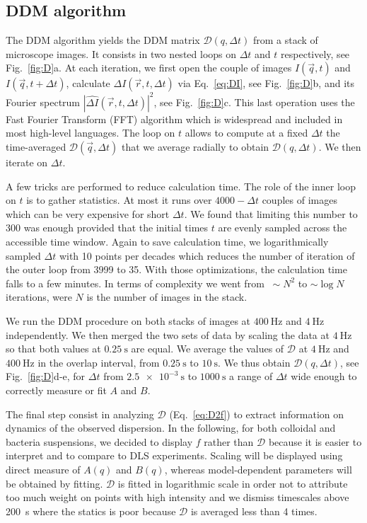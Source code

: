 \documentclass[prb,reprint,amsmath,amssymb]{revtex4-1}
\newcommand{\tg}[1]{{\color{magenta}#1}} %
\begin{document}
\subsection{DDM algorithm}

\tg{The DDM algorithm yields the DDM matrix $\mathcal{D}(q,\Delta t)$ from a stack of microscope images. It consists in two nested loops on $\Delta t$ and $t$ respectively, see Fig.~\ref{fig:D}a. At each iteration, we first open the couple of images $I(\vec{q},t)$ and $I(\vec{q},t+\Delta t)$, calculate $\Delta I(\vec{r},t, \Delta t)$ via Eq.~\eqref{eq:DI}, see Fig.~\ref{fig:D}b, and its Fourier spectrum $\left|\widehat{\Delta I}(\vec{r},t, \Delta t)\right|^2$, see Fig.~\ref{fig:D}c. This last operation uses the Fast Fourier Transform (FFT) algorithm which is widespread and included in most high-level languages. The loop on $t$ allows to compute at a fixed $\Delta t$ the time-averaged $\mathcal{D}(\vec{q}, \Delta t)$ that we average radially to obtain $\mathcal{D}(q, \Delta t)$. We then iterate on $\Delta t$.

A few tricks are performed to reduce calculation time. The role of the inner loop on $t$ is to gather statistics. At most it runs over $4000-\Delta t$ couples of images which can be very expensive for short $\Delta t$. We found that limiting this number to 300 was enough provided that the initial times $t$ are evenly sampled across the accessible time window. Again to save calculation time, we logarithmically sampled $\Delta t$ with 10 points per decades which reduces the number of iteration of the outer loop from 3999 to 35. With those optimizations, the calculation time falls to a few minutes. In terms of complexity we went from $~\sim N^2$ to $\sim \log N$ iterations, were $N$ is the number of images in the stack.

We run the DDM procedure on both stacks of images at $\SI{400}{\hertz}$ and $\SI{4}{\hertz}$ independently. We then merged the two sets of data by scaling the data at $\SI{4}{\hertz}$ so that both values at $\SI{0.25}{\second}$ are equal. We average the values of $\mathcal{D}$ at $\SI{4}{\hertz}$ and $\SI{400}{\hertz}$ in the overlap interval, from $\SI{0.25}{\second}$ to $\SI{10}{\second}$. We thus obtain $\mathcal{D} (q, \Delta t)$, see Fig.~\ref{fig:D}d-e, for $\Delta t$ from $\SI{2.5e-3}{\second}$ to $\SI{1000}{\second}$ a range of $\Delta t$ wide enough to correctly measure or fit $A$ and $B$.

The final step consist in analyzing $\mathcal{D}$ (Eq.~\ref{eq:D2f}) to extract information on dynamics of the observed dispersion. In the following, for both colloidal and bacteria suspensions, we decided to display $f$ rather than $\mathcal{D}$ because it is easier to interpret and to compare to DLS experiments. Scaling will be displayed using direct measure of $A(q)$ and $B(q)$, whereas model-dependent parameters will be obtained by fitting. $\mathcal{D}$ is fitted in logarithmic scale in order not to attribute too much weight on points with high intensity and we dismiss timescales above \SI{200}{\second} where the statics is poor because $\mathcal{D}$ is averaged less than 4 times.}
\end{document}
